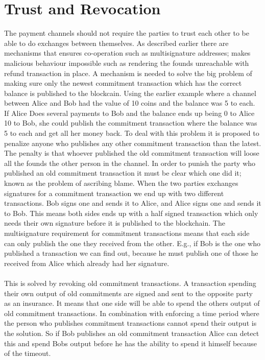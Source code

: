 \documentclass[informationsecurity]{gucmasterproject}
\begin{document}
\section{Trust and Revocation}

The payment channels should not require the parties to trust each other to be able to do exchanges between themselves.
As described earlier there are mechanisms that ensures co-operation such as multisignature addresses; makes malicious behaviour impossible such as rendering the founds unreachable with refund transaction in place. A mechanism is needed to solve the big problem of making sure only the newest commitment transaction which has the correct balance is published to the blockcain. Using the earlier example where a channel between Alice and Bob had the value of 10 coins and the balance was 5 to each. If Alice Does several payments to Bob and the balance ends up being 0 to Alice 10 to Bob, she could publish the commitment transaction where the balance was 5 to each and get all her money back. To deal with this problem it is proposed to penalize anyone who publishes any other commitment transaction than the latest. The penalty is that whoever published the old commitment transaction will loose all the founds the other person in the channel.
In order to punish the party who published an old commitment transaction it must be clear which one did it; known as the problem of ascribing blame. When the two parties exchanges signatures for a commitment transaction we end up with two different transactions. Bob signs one and sends it to Alice, and Alice signs one and sends it to Bob. This means both sides ends up with a half signed transaction which only needs their own signature before it is published to the blockchain. The multisignature requirement for commitment transactions means that each side can only publish the one they received from the other.
E.g., if Bob is the one who published a transaction we can find out, because he must publish one of those he received from Alice which already had her signature.

\paragraph{}
This is solved by revoking old commitment transactions. A transaction spending their own output of old commitments are signed and sent to the opposite party as an insurance. It means that one side will be able to spend the others output of old commitment transactions. In combination with enforcing a time period where the person who publishes commitment transactions cannot spend their output is the solution. So if Bob publishes an old commitment transaction Alice can detect this and spend Bobs output before he has the ability to spend it himself because of the timeout.
\end{document}

